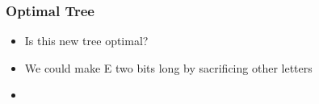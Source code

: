 \documentclass{../ucll-slides}
\begin{document}
\begin{frame}
  \frametitle{Optimal Tree}
  \begin{itemize}
    \item Is this new tree optimal?
    \item We could make E two bits long by sacrificing other letters
    \item 
  \end{itemize}
\end{frame}
\end{document}
